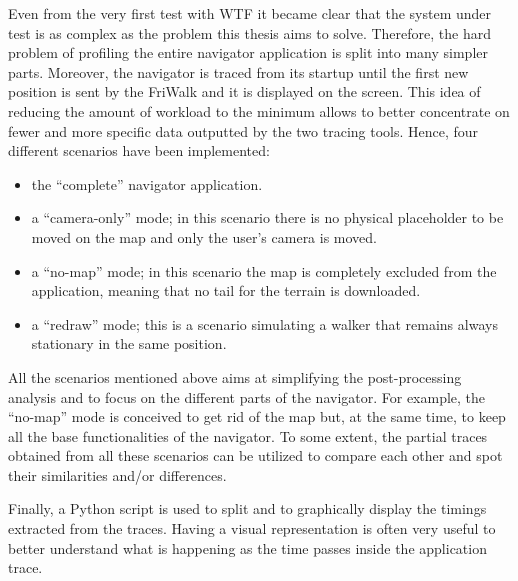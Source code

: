 Even from the very first test with WTF it became clear that the system under
test is as complex as the problem this thesis aims to solve. Therefore, the hard
problem of profiling the entire navigator application is split into many simpler
parts. Moreover, the navigator is traced from its startup until the first new
position is sent by the FriWalk and it is displayed on the screen. This idea of reducing the
amount of workload to the minimum allows to better concentrate on fewer and more
specific data outputted by the two tracing tools. Hence, four different scenarios
have been implemented:
\begin{itemize}
    \item the ``complete'' navigator application.
    \item a ``camera-only'' mode; in this scenario there is no physical placeholder
        to be moved on the map and only the user's camera is moved.
    \item a ``no-map'' mode; in this scenario the map is completely
        excluded from the application, meaning that no tail for the terrain is
        downloaded.
    \item a ``redraw'' mode; this is a scenario simulating a walker that remains
        always stationary in the same position.
\end{itemize}

All the scenarios mentioned above aims at simplifying the post-processing
analysis and to focus on the different parts of the navigator. For example, the
``no-map'' mode is conceived to get rid of the map but, at the same time, to keep
all the base functionalities of the navigator. To some extent, the partial traces
obtained from all these scenarios can be utilized to compare each other and spot
their similarities and/or differences.

Finally, a Python script is used to split and to graphically display the
timings extracted from the traces. Having a visual representation is often very
useful to better understand what is happening as the time passes inside the application
trace.

